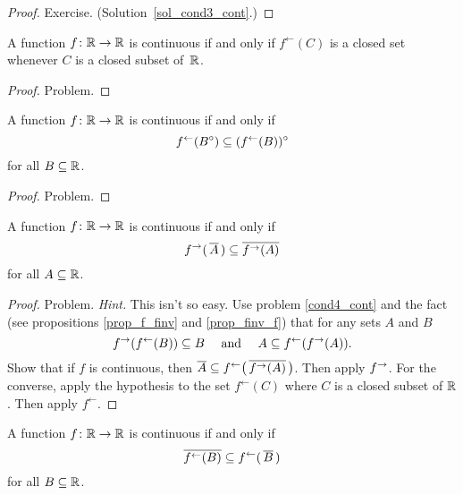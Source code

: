 \begin{proof} Exercise.  (Solution~\ref{sol_cond3_cont}.)
  \ns \end{proof}
























\begin{prop}\label{cond4_cont} A function $f\colon\mathbb{R} \rightarrow \mathbb{R}$ is continuous if and only if
$f^\gets(C)$ is a closed set whenever $C$ is a closed subset of~$\mathbb{R}$.
\end{prop}

\begin{proof} Problem. \ns \end{proof}

\begin{prop} A function $f\colon\mathbb{R} \rightarrow \mathbb{R}$ is continuous if and only if
 \[f^\gets(B^{\circ}) \subseteq (f^\gets(B))^{\circ}\]
for all $B \subseteq \mathbb{R}$.
\end{prop}


\begin{proof} Problem.  \ns \end{proof}

\begin{prop} A function $f\colon\mathbb{R} \rightarrow \mathbb{R}$ is continuous if and only if
 \[f^\rightarrow(\,\overline{A}\,) \subseteq \overline{f^\rightarrow (A)}\]
for all $A \subseteq \mathbb{R}$.
\end{prop}

\begin{proof} Problem.  \emph{Hint.}  This isn't so easy.  Use problem \ref{cond4_cont}
and the fact (see propositions \ref{prop_f_finv} and \ref{prop_finv_f}) that for any sets $A$
and $B$
 \[f^\rightarrow(f^\gets(B)) \subseteq B \quad\text{ and }
                     \quad A \subseteq f^\gets(f^\rightarrow(A)).\]
Show that if $f$ is continuous, then $\overline{A} \subseteq
f^\gets\bigl(\,\overline{f^\rightarrow(A)}\,\bigr)$. Then apply $f^\rightarrow$.  For the converse, apply the
hypothesis to the set $f^\gets(C)$ where $C$ is a closed subset of $\mathbb{R}$.  Then apply
$f^\gets$.
\end{proof}

\begin{prop}\label{cond7_cont} A function $f\colon\mathbb{R} \rightarrow \mathbb{R}$ is continuous if and only if
 \[\overline{f^\gets(B)} \subseteq f^\gets(\,\overline{B}\,)\]
for all $B \subseteq \mathbb{R}$.
\end{prop}

